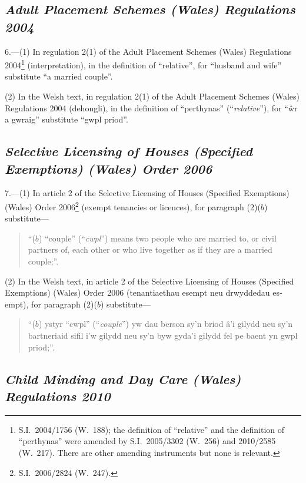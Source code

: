 \documentclass[12pt,a4paper]{article}
\begin{document}
\subsection*{\itshape Adult Placement Schemes (Wales) Regulations 2004}

6.—(1) In regulation 2(1) of the Adult Placement Schemes (Wales) Regulations 2004\footnote{S.I.~2004/1756 (W.~188); the definition of “relative” and the definition of “perthynas” were amended by S.I.~2005/3302 (W.~256) and 2010/2585 (W.~217). There are other amending instruments but none is relevant.} (interpretation), in the definition of “relative”, for “husband and wife” substitute “a married couple”.

(2) In the Welsh text, in regulation 2(1) of the Adult Placement Schemes (Wales) Regulations 2004 (dehongli), in the definition of “perthynas” (“\emph{relative}”), for “\^wr a gwraig” substitute “gwpl priod”.

\subsection*{\itshape Selective Licensing of Houses (Specified Exemptions) (Wales) Order 2006}

7.—(1) In article 2 of the Selective Licensing of Houses (Specified Exemptions) (Wales) Order 2006\footnote{S.I.~2006/2824 (W.~247).} (exempt tenancies or licences), for paragraph (2)($b$)  substitute—
\begin{quotation}
“($b$) “couple” (“\emph{cwpl}”) means two people who are married to, or civil partners of, each other or who live together as if they are a married couple;”.
\end{quotation}

(2) In the Welsh text, in article 2 of the Selective Licensing of Houses (Specified Exemptions) (Wales) Order 2006 (\foreignlanguage{welsh}{tenantiaethau esempt neu drwyddedau esempt}), for paragraph (2)($b$)  substitute—
\begin{quotation}
\foreignlanguage{welsh}{“($b$) ystyr “cwpl” (“\emph{couple}”) yw dau berson sy’n briod â’i gilydd neu sy’n bartneriaid sifil i’w gilydd neu sy’n byw gyda’i gilydd fel pe baent yn gwpl priod;”.}
\end{quotation}

\subsection*{\itshape\sloppy Child Minding and Day Care (Wales) Regulations 2010}
\end{document}

